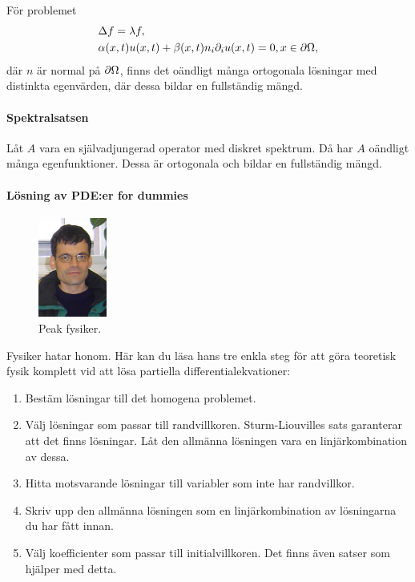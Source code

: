För problemet
\begin{align*}
	&\Delta f = \lambda f, \\
	&\alpha(x, t)u(x, t) + \beta(x, t)n_{i}\partial_{i}u(x, t) = 0, x\in\partial \Omega,
\end{align*}
där $n$ är normal på $\partial \Omega$, finns det oändligt många ortogonala lösningar med distinkta egenvärden, där dessa bildar en fullständig mängd.

\paragraph{Spektralsatsen}
Låt $A$ vara en självadjungerad operator med diskret spektrum. Då har $A$ oändligt många egenfunktioner. Dessa är ortogonala och bildar en fullständig mängd.

\paragraph{Lösning av PDE:er for dummies}
\begin{figure}[!ht]
	\centering
	\includegraphics[width = 0.2\textwidth]{./Images/langmann.jpg}
	\caption{Peak fysiker.}
	\label{fig:langmann}
\end{figure}
Fysiker hatar honom. Här kan du läsa hans tre enkla steg för att göra teoretisk fysik komplett vid att lösa partiella differentialekvationer:
\begin{enumerate}
	\item Bestäm lösningar till det homogena problemet.
	\item Välj lösningar som passar till randvillkoren. Sturm-Liouvilles sats garanterar att det finns lösningar. Låt den allmänna lösningen vara en linjärkombination av dessa.
	\item Hitta motsvarande lösningar till variabler som inte har randvillkor.
	\item Skriv upp den allmänna lösningen som en linjärkombination av lösningarna du har fått innan.
	\item Välj koefficienter som passar till initialvillkoren. Det finns även satser som hjälper med detta.
\end{enumerate}

